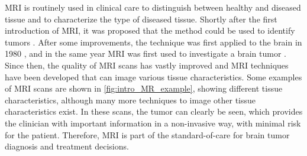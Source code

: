 \gls{MRI} is routinely used in clinical care to distinguish between healthy and diseased tissue and to characterize the type of diseased tissue.
Shortly after the first introduction of \gls{MRI}, it was proposed that the method could be used to identify \glspl{tumor} \autocite{damadian1971tumor}.
After some improvements, the technique was first applied to the brain in 1980 \autocite{holland1980brain}, and in the same year MRI was first used to investigate a brain \gls{tumor} \autocite{hawkes1980NMRbrain}.
Since then, the quality of \gls{MRI} scans has vastly improved and \gls{MRI} techniques have been developed that can image various tissue characteristics.
Some examples of \gls{MRI} scans are shown in \cref{fig:intro_MR_example}, showing different tissue characteristics, although many more techniques to image other tissue characteristics exist.
In these scans, the \gls{tumor} can clearly be seen, which provides the clinician with important information in a non-invasive way, with minimal risk for the patient.
Therefore, \gls{MRI} is part of the standard-of-care for brain \gls{tumor} diagnosis and treatment decisions.

